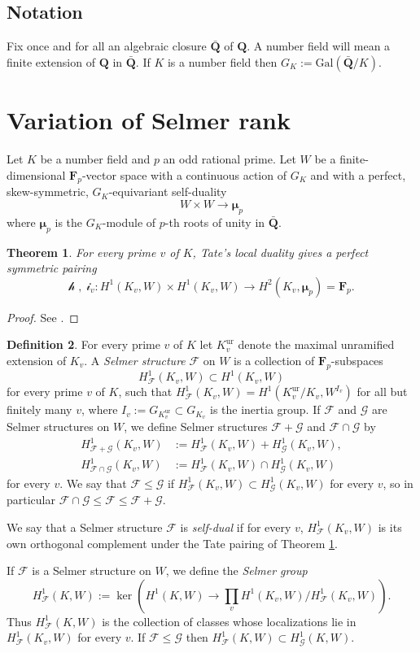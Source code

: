\documentclass[reqno]{amsart}
\newtheorem{thm}{Theorem}[section]
\theoremstyle{definition}
\newtheorem{defn}[thm]{Definition}
\def\Q{\mathbf{Q}}
\def\F{\mathbf{F}}
\def\Fp{\F_p}
\def\cF{\mathcal{F}}
\def\cG{\mathcal{G}}
\def\T{W}
\def\ld{\mathcal{h}}
\def\rd{\mathcal{i}}
\def\Gal{\mathrm{Gal}}
\def\unr{\mathrm{ur}}
\def\too{\longrightarrow}
\def\Hs#1{H^1_{#1}}
\def\HF{\Hs{\cF}}
\def\HG{\Hs{\cG}}
\def\bmu{\boldsymbol{\mu}}
\def\rf{\Fp}
\def\pair#1#2{\ld#1,#2\rd}
\begin{document}
\subsection*{Notation}  
Fix once and for all an algebraic closure $\bar{\Q}$ of $\Q$.  
A number field will mean a finite extension of $\Q$ in $\bar{\Q}$.  
If $K$ is a number field then $G_K := \Gal(\bar{\Q}/K)$.  



\section{Variation of Selmer rank}
\label{var}

Let $K$ be a number field and $p$ an odd rational prime.   
Let $\T$ be a finite-dimensional $\rf$-vector space with a continuous 
action of $G_K$ and with a perfect, skew-symmetric, 
$G_K$-equivariant self-duality 
$$
\T \times \T \too  \bmu_p 
$$
where $\bmu_p$ is the $G_K$-module of $p$-th roots of unity in $\bar{\Q}$.  

\begin{thm}
\label{tld}
For every prime $v$ of $K$, 
Tate's local duality gives a perfect symmetric pairing
$$
\pair{\;}{\;}_v : H^1(K_v,\T) \times H^1(K_v,\T) \too H^2(K_v,\bmu_p) = \Fp.
$$
\end{thm}

\begin{proof}
See \cite{tate}.
\end{proof}

\begin{defn}
\label{ss}
For every prime $v$ of $K$ let 
$K_v^\unr$ denote the maximal unramified extension of $K_v$.
A {\em Selmer structure} $\cF$ on $\T$ is a collection of $\rf$-subspaces 
$$
\HF(K_v,\T) \subset H^1(K_v,\T)
$$
for every prime $v$ of $K$, such that $\HF(K_v,\T) = H^1(K_v^\unr/K_v,\T^{I_v})$ 
for all but finitely many $v$, where $I_v := G_{K_v^\unr} \subset G_{K_v}$ is the inertia group.  
If $\cF$ and $\cG$ are Selmer structures on $\T$, we define 
Selmer structures $\cF+\cG$ and $\cF\cap\cG$ by 
\begin{align*}
\Hs{\cF+\cG}(K_v,\T) &:= \HF(K_v,\T)+\HG(K_v,\T), \\
\Hs{\cF\cap\cG}(K_v,\T) &:= \HF(K_v,\T)\cap\HG(K_v,\T)
\end{align*}
for every $v$.  We say that $\cF \le \cG$ if $\HF(K_v,\T) \subset \HG(K_v,\T)$ 
for every $v$, so in particular $\cF \cap \cG \le \cF \le \cF+\cG$.

We say that a Selmer structure $\cF$ is {\em self-dual} if 
for every $v$, $\HF(K_v,\T)$ is its own orthogonal complement 
under the Tate pairing of Theorem \ref{tld}.

If $\cF$ is a Selmer structure on $\T$, we define the {\em Selmer group} 
$$
\HF(K,\T) := \ker(H^1(K,\T) \too \textstyle\prod_{v} H^1(K_v,\T)/\HF(K_v,\T)). 
$$
Thus $\HF(K,\T)$ is 
the collection of classes whose localizations lie in $\HF(K_v,\T)$ 
for every $v$.  If $\cF \le \cG$ then $\HF(K,\T) \subset \HG(K,\T)$.
\end{defn}
\end{document}
